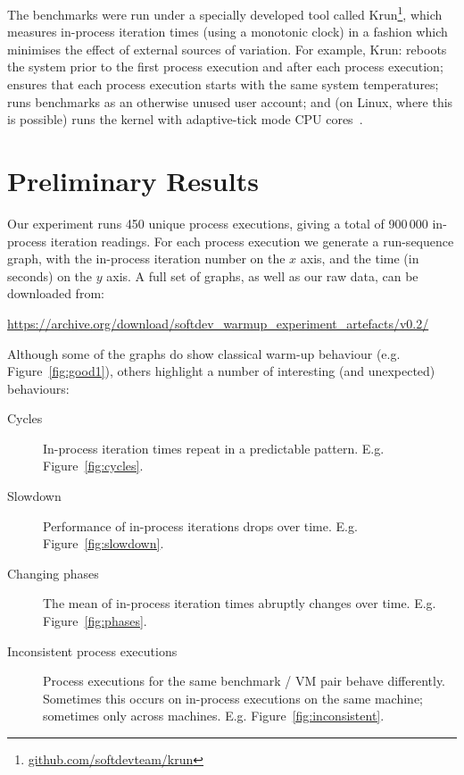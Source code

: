 \documentclass[preprint]{sigplanconf}
\newcommand{\krun}{Krun\xspace}
\begin{document}
The benchmarks were run under a specially developed tool called
\krun\footnote{\url{github.com/softdevteam/krun}}, which
measures in-process iteration times (using a monotonic clock) in a
fashion which minimises the effect of external sources of variation. For example,
\krun: reboots the system prior to the first process execution
and after each process execution; ensures that each process execution starts
with the same system temperatures;
runs benchmarks as an otherwise unused user
account; and (on Linux, where this is possible) runs the kernel with
adaptive-tick mode CPU cores~\cite{tickless}.

\section{Preliminary Results}
\label{sec:Results}


Our experiment runs 450 unique process executions, giving a total of 900\,000
in-process iteration readings. For each process execution we generate a
run-sequence graph, with the in-process iteration number on the $x$ axis, and the
time (in seconds) on the $y$ axis. A full set of graphs, as well as our raw
data, can be downloaded from:
\vspace{-1em}
\begin{center}
{\small%
\url{https://archive.org/download/softdev_warmup_experiment_artefacts/v0.2/}
}
\end{center}

Although some of the graphs do show classical warm-up behaviour (e.g.
Figure~\ref{fig:good1}), others highlight a number of interesting (and
unexpected) behaviours:

\begin{description}
\item[Cycles] In-process iteration times repeat in a predictable pattern. E.g.
Figure~\ref{fig:cycles}.
\item[Slowdown] Performance of in-process iterations drops over time. E.g.
Figure~\ref{fig:slowdown}.
\item[Changing phases] The mean of in-process iteration times abruptly changes
over time. E.g. Figure~\ref{fig:phases}.
\item[Inconsistent process executions] Process executions for the same
benchmark / VM pair behave differently. Sometimes this occurs on in-process
executions on the same machine; sometimes only across machines. E.g.
Figure~\ref{fig:inconsistent}.
\end{description}
\end{document}
